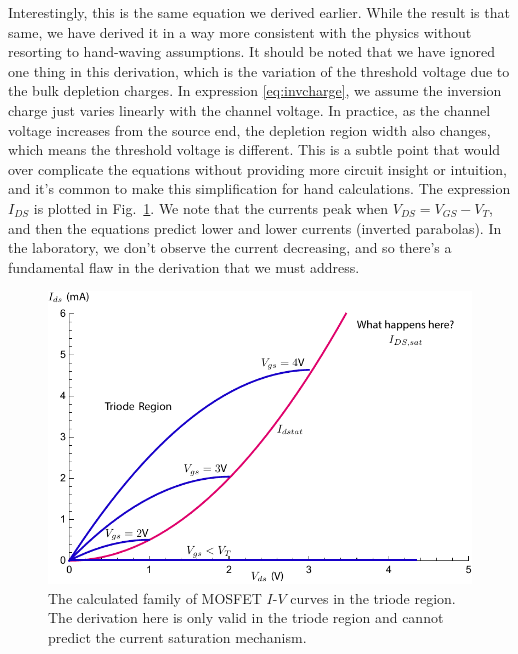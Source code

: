Interestingly, this is the same equation we derived earlier.  While the result is that same, we have derived it in a way more consistent with the physics without resorting to hand-waving assumptions.  It should be noted that we have ignored one thing in this derivation, which is the variation of the threshold voltage due to the bulk depletion charges.  In expression \ref{eq:invcharge}, we assume the inversion charge just varies linearly with the channel voltage. In practice, as the channel voltage increases from the source end, the depletion region width also changes, which means the threshold voltage is different. This is a subtle point that would over complicate the equations without providing more circuit insight or intuition, and it's common to make this simplification for hand calculations.
The expression $I_{DS}$ is plotted in Fig.~\ref{fig:ids_triode_only}.  We note that the currents peak when $V_{DS} = V_{GS} - V_T$, and then the equations predict lower and lower currents (inverted parabolas).  In the laboratory, we don't observe the current decreasing, and so there's a fundamental flaw in the derivation that we must address.  
\begin{figure}[tb]
\centering
\includegraphics[width=.75\columnwidth]{ids_triode_only} 
\caption{The calculated family of MOSFET $I$-$V$ curves in the triode region.  The derivation here is only valid in the triode region and cannot predict the current saturation mechanism.}
\label{fig:ids_triode_only}
\end{figure}
